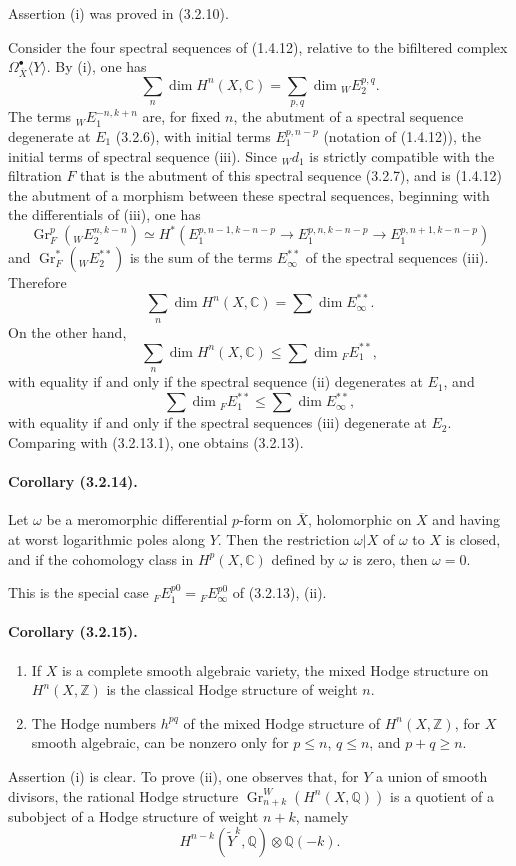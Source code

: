 \documentclass[10pt]{article}
\newcommand{\C}{\mathbb C}
\newcommand{\Q}{\mathbb Q}
\newcommand{\Z}{\mathbb Z}
\newcommand{\Gr}{\operatorname{Gr}}
\begin{document}
Assertion (i) was proved in (3.2.10).

Consider the four spectral sequences of (1.4.12), relative to the bifiltered complex $\Omega_{\overline X}^{\bullet}\langle Y\rangle$. By (i), one has
\[
\sum_n\dim H^n(X,\C)=\sum_{p,q}\dim {}_WE_2^{p,q}.
\]
The terms ${}_WE_1^{-n,k+n}$ are, for fixed $n$, the abutment of a spectral sequence degenerate at $E_1$ (3.2.6), with initial terms $E_1^{p,n-p}$ (notation of (1.4.12)), the initial terms of spectral sequence (iii). Since ${}_Wd_1$ is strictly compatible with the filtration $F$ that is the abutment of this spectral sequence (3.2.7), and is (1.4.12) the abutment of a morphism between these spectral sequences, beginning with the differentials of (iii), one has
\[
\Gr_F^p({}_WE_2^{n,k-n})\simeq
H^*(E_1^{p,n-1,k-n-p}\to E_1^{p,n,k-n-p}\to E_1^{p,n+1,k-n-p})
\]
and $\Gr_F^*({}_WE_2^{**})$ is the sum of the terms $E_\infty^{**}$ of the spectral sequences (iii). Therefore
\[
\tag{3.2.13.1}
\sum_n \dim H^n(X,\C)=\sum\dim E_\infty^{**}.
\]
On the other hand,
\[
\sum_n \dim H^n(X,\C)\le \sum \dim {}_F E_1^{**},
\]
with equality if and only if the spectral sequence (ii) degenerates at $E_1$, and
\[
\sum\dim {}_F E_1^{**}\le \sum\dim E_\infty^{**},
\]
with equality if and only if the spectral sequences (iii) degenerate at $E_2$. Comparing with (3.2.13.1), one obtains (3.2.13).

\paragraph{Corollary (3.2.14).} Let $\omega$ be a meromorphic differential $p$-form on $\overline X$, holomorphic on $X$ and having at worst logarithmic poles along $Y$. Then the restriction $\omega|X$ of $\omega$ to $X$ is closed, and if the cohomology class in $H^p(X,\C)$ defined by $\omega$ is zero, then $\omega=0$.

This is the special case ${}_FE_1^{p0}={}_FE_\infty^{p0}$ of (3.2.13), (ii).

\paragraph{Corollary (3.2.15).}
\begin{enumerate}[label=(\roman*)]
\item If $X$ is a complete smooth algebraic variety, the mixed Hodge structure on $H^n(X,\Z)$ is the classical Hodge structure of weight $n$.
\item The Hodge numbers $h^{pq}$ of the mixed Hodge structure of $H^n(X,\Z)$, for $X$ smooth algebraic, can be nonzero only for $p\le n$, $q\le n$, and $p+q\ge n$.
\end{enumerate}
Assertion (i) is clear. To prove (ii), one observes that, for $Y$ a union of smooth divisors, the rational Hodge structure $\Gr_{n+k}^W(H^n(X,\Q))$ is a quotient of a subobject of a Hodge structure of weight $n+k$, namely
\[
H^{n-k}(\widetilde Y^k,\Q)\otimes\Q(-k).
\]
\end{document}
